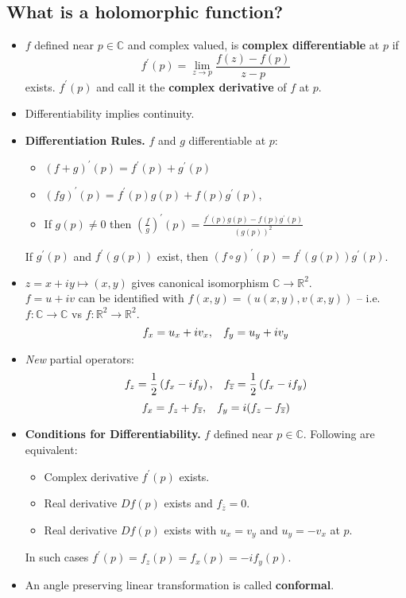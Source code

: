 \documentclass{article}
\newenvironment{topic}[1]{%
{\subsection{#1}}%
\begin{itemize}%
}{%
\end{itemize}%
}
\newcommand{\theorem}[1]{\item {\bf #1.}}
\newcommand{\definition}[1]{\item}
\newcommand{\term}[1]{{\bf #1}}
\newcommand{\remark}{\item}
\begin{document}
\begin{topic}{What is a holomorphic function?}

\definition{Complex Differentiable} $f$ defined near $p \in \mathbb{C}$ and complex valued, is \term{complex differentiable} at $p$ if $$f^\prime(p) = \lim_{z \to p} \dfrac{f(z) - f(p)}{z - p}$$ exists. $f^\prime(p)$ and call it the \term{complex derivative} of $f$ at $p$.

\remark Differentiability implies continuity.

\theorem{Differentiation Rules} $f$ and $g$ differentiable at $p$:
\begin{itemize}
\item $(f + g)^\prime(p) = f^\prime(p) + g^\prime(p)$
\item $(fg)^\prime(p) = f^\prime(p)g(p) + f(p)g^\prime(p)$,
\item If $g(p) \neq 0$ then $\left(\frac{f}{g}\right)^\prime(p) = \frac{f^\prime(p)g(p) - f(p)g^\prime(p)}{(g(p))^2}$
\end{itemize}
If $g^\prime(p)$ and $f^\prime(g(p))$ exist, then $(f \circ g)^\prime(p) = f^\prime(g(p)) g^\prime(p)$.

\remark $z = x + iy \mapsto (x, y)$ gives canonical isomorphism $\mathbb{C} \to \mathbb{R}^2$.\\
$f = u + iv$ can be identified with $f(x, y) = (u(x, y), v(x, y))$ -- i.e. $f : \mathbb{C} \to \mathbb{C}$ vs $f : \mathbb{R}^2 \to \mathbb{R}^2$.
$$f_x = u_x + i v_x, \hskip 0.3cm f_y = u_y + i v_y$$

\remark {\em New} partial operators: 
$$f_z = \frac{1}{2}\left(f_x - i f_y\right), \hskip 0.3cm f_{\overline{z}} = \frac{1}{2}\left(f_x - i f_y\right)$$
$$f_x = f_z + f_{\overline{z}}, \hskip 0.3cm f_y = i(f_z - f_{\overline{z}})$$

\theorem{Conditions for Differentiability} $f$ defined near $p \in \mathbb{C}$. Following are equivalent:
\begin{itemize}
\item Complex derivative $f^\prime(p)$ exists.
\item Real derivative $Df(p)$ exists and $f_{\overline{z}} = 0$.
\item Real derivative $Df(p)$ exists with $u_x = v_y$ and $u_y = -v_x$ at $p$.
\end{itemize}
In such cases $f^\prime(p) = f_z(p) = f_x(p) = -i f_y(p)$.

\remark An angle preserving linear transformation is called \term{conformal}.


\end{topic}
\end{document}
